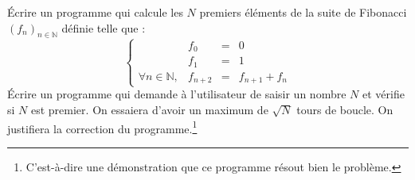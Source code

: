 \documentclass[../../../main.tex]{subfiles}
\begin{document}
 Écrire un programme qui calcule les $N$ premiers éléments de la suite de Fibonacci $(f_{n})_{n\in{\mathbb{N}}}$ définie telle que :
$$
\left\{\begin{array}{llcl}
& f_{0} & = & 0 \\
& f_{1} & = & 1 \\
\forall{n\in{\mathbb{N}}}, & f_{n+2} & = & f_{n+1} + f_{n}
\end{array}\right.
$$
Écrire un programme qui demande à l'utilisateur de saisir un nombre $N$ et vérifie si $N$ est premier. On essaiera d'avoir un maximum de $\sqrt{N}$ tours de boucle. On justifiera la correction du programme.\footnote{C'est-à-dire une démonstration que ce programme résout bien le problème.}
\end{document}
